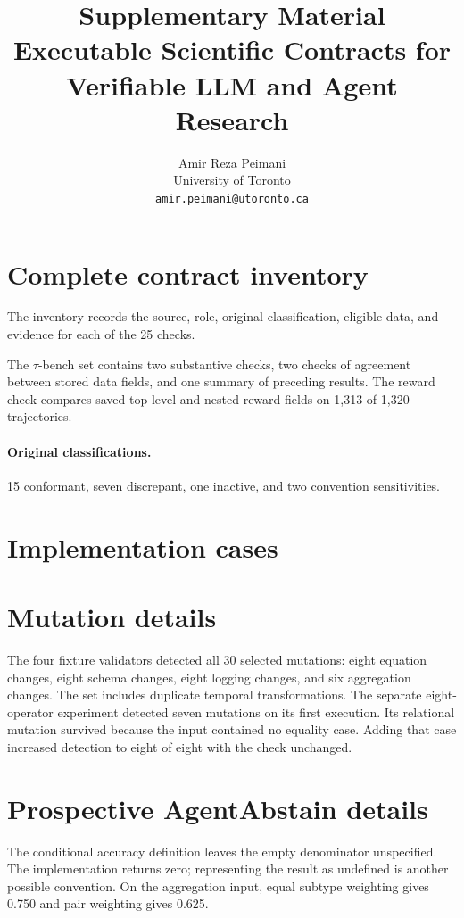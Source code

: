 \documentclass[11pt]{article}
\title{Supplementary Material\\Executable Scientific Contracts for Verifiable LLM and Agent Research}
\author{Amir Reza Peimani\\University of Toronto\\\texttt{amir.peimani@utoronto.ca}}
\date{}
\begin{document}
\maketitle
\section{Complete contract inventory}
The inventory records the source, role, original classification, eligible data, and evidence for each of the 25 checks.

The $\tau$-bench set contains two substantive checks, two checks of agreement between stored data fields, and one summary of preceding results. The reward check compares saved top-level and nested reward fields on 1,313 of 1,320 trajectories.

\paragraph{Original classifications.} 15 conformant, seven discrepant, one inactive, and two convention sensitivities.


\section{Implementation cases}



\section{Mutation details}
The four fixture validators detected all 30 selected mutations: eight equation changes, eight schema changes, eight logging changes, and six aggregation changes. The set includes duplicate temporal transformations. The separate eight-operator experiment detected seven mutations on its first execution. Its relational mutation survived because the input contained no equality case. Adding that case increased detection to eight of eight with the check unchanged.
\FloatBarrier

\par\noindent\begin{minipage}{\linewidth}
\section{Prospective AgentAbstain details}


\end{minipage}\par
{}
The conditional accuracy definition leaves the empty denominator unspecified. The implementation returns zero; representing the result as undefined is another possible convention. On the aggregation input, equal subtype weighting gives 0.750 and pair weighting gives 0.625.
\end{document}
